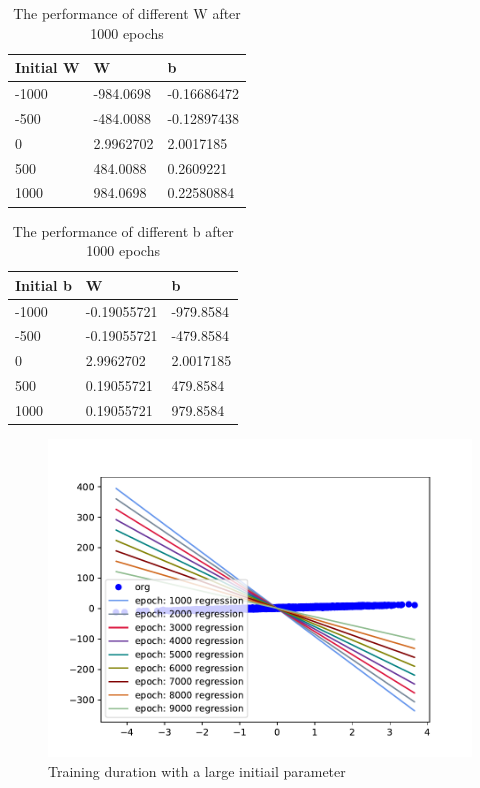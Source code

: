 \documentclass{article}
\begin{document}
\begin{table}
  \caption{The performance of different W after 1000 epochs}
  \label{tab:w}
  \centering
  \begin{tabular}{lll}
    \toprule
    Initial W     & W     & b  \\
    \midrule
    -1000 & -984.0698 & -0.16686472    \\
    -500     & -484.0088 & -0.12897438     \\
    0     & 2.9962702      & 2.0017185  \\
    500     & 484.0088 & 0.2609221     \\
    1000    & 984.0698     & 0.22580884  \\
    \bottomrule
  \end{tabular}
\end{table}

\begin{table}
  \caption{The performance of different b after 1000 epochs}
  \label{tab:b}
  \centering
  \begin{tabular}{lll}
    \toprule
    Initial b     & W     & b  \\
    \midrule
    -1000 & -0.19055721  & -979.8584     \\
    -500     & -0.19055721 & -479.8584     \\
    0     & 2.9962702       & 2.0017185  \\
    500     & 0.19055721 & 479.8584      \\
    1000    & 0.19055721     & 979.8584  \\
    \bottomrule
  \end{tabular}
\end{table}

\begin{figure}
  \centering
  \includegraphics[scale=0.5]{imgs/epoch.pdf}
  \caption{Training duration with a large initiail parameter}
  \label{epoch}
\end{figure}
\end{document}
